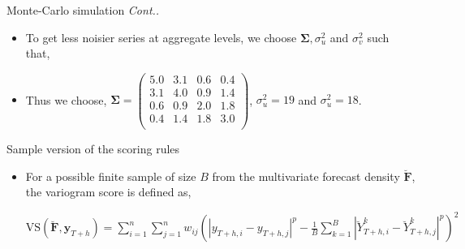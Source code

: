 \documentclass[11pt,xcolor=dvipsnames,table]{beamer} %
\begin{document}
\begin{frame}[noframenumbering]{Monte-Carlo simulation \textit{Cont..}}
\begin{itemize}[<+-| alert@+>]
\item To get less noisier series at aggregate levels, we choose $\bm{\Sigma}, \sigma^2_u$ and $\sigma^2_v$ such that,
\begin{table}
	\small
	\centering %
\end{table}

\item Thus we choose,
$\bm{\Sigma} =
\begin{pmatrix}
5.0 & 3.1 & 0.6 & 0.4 \\
3.1 & 4.0 & 0.9 & 1.4 \\
0.6 & 0.9 & 2.0 & 1.8 \\
0.4 & 1.4 & 1.8 & 3.0 \\
\end{pmatrix}$,
$\sigma^2_u = 19$ and $\sigma^2_u = 18$.


\end{itemize} 
\end{frame}
%

\begin{frame}[noframenumbering]{Sample version of the scoring rules}
\begin{itemize}[<+-| alert@+>]
	
	\item For a possible finite sample of size $B$ from the multivariate forecast density $\breve{\bm{F}}$, the variogram score is defined as,
	\begin{table}
	\small
	$\text{VS}(\breve{\bm{F}}, \bm{y}_{T+h}) = \displaystyle\sum_{i=1}^{n}\displaystyle\sum_{j=1}^{n}w_{ij}\left(|y_{T+h,i} - y_{T+h,j}|^p - \frac{1}{B} \displaystyle\sum_{k=1}^{B} |\breve{Y}^k_{T+h,i}-\breve{Y}^k_{T+h,j}|^p\right)^2$
	\end{table}
		
	
\end{itemize} 
\end{frame}
%
\end{document}
